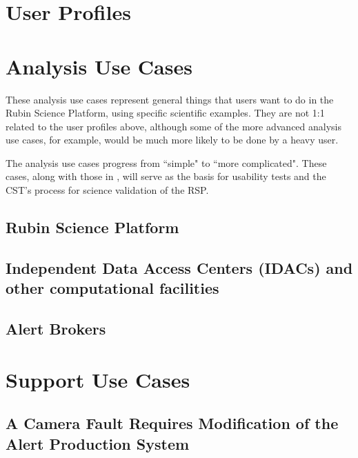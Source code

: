 \documentclass[DM,lsstdraft,authoryear,toc]{lsstdoc}
\begin{document}
\clearpage
\section{User Profiles}




\clearpage
\section{Analysis Use Cases}

These analysis use cases represent general things that users want to do in the Rubin Science Platform,
using specific scientific examples.
They are not 1:1 related to the user profiles above, although some of the more advanced analysis
use cases, for example, would be much more likely to be done by a heavy user.

The analysis use cases progress from ``simple" to ``more complicated".
These cases, along with those in , will serve as the basis for usability tests and the CST's process for science validation of
the RSP.

\subsection{Rubin Science Platform}



\subsection{Independent Data Access Centers (IDACs) and other computational facilities}



\subsection{Alert Brokers}



\clearpage
\section{Support Use Cases}

\clearpage


\clearpage


\clearpage


\clearpage
\subsection{A Camera Fault Requires Modification of the Alert Production System}

\end{document}
